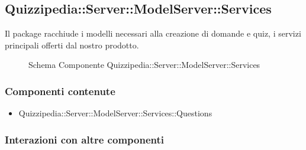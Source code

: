 \subsection{Quizzipedia::Server::ModelServer::Services}
Il package racchiude i modelli necessari alla creazione di domande e quiz, i servizi principali offerti dal nostro prodotto.
\begin{figure}[H]
\centering
\noindent{}
\caption[Schema Componente Quizzipedia::Server::ModelServer::Services]{Schema Componente Quizzipedia::Server::ModelServer::Services}
\end{figure}
\subsubsection{Componenti contenute}
\begin{itemize}
\item Quizzipedia::Server::ModelServer::Services::Questions
\end{itemize}
\subsubsection{Interazioni con altre componenti}
